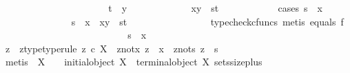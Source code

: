 \begin{isabellebody}
\ \ \ \ \ \ \ \ \ \isamarkupfalse%
\isanewline
\ \ \ \ \ \ \ \ \ \ \ \isamarkupfalse%
\ {\isachardoublequoteopen}t\ {\isasymnoteq}\ y{}{\isachardoublequoteclose}\isanewline
\ \ \ \ \ \ \ \ \ \ \ \isamarkupfalse%
\ {\isachardoublequoteopen}{\isasymlangle}x{\isacharcomma}{\kern0pt}y{\isasymrangle}\ {\isacharequal}{\kern0pt}\ {\isasymlangle}s{\isacharcomma}{\kern0pt}t{\isasymrangle}{\isachardoublequoteclose}\isanewline
\ \ \ \ \ \ \ \ \ \ \ \isamarkupfalse%
{\isacharparenleft}{\kern0pt}cases\ {\isachardoublequoteopen}s\ {\isacharequal}{\kern0pt}\ x{\isachardoublequoteclose}{\isacharparenright}{\kern0pt}\isanewline
\ \ \ \ \ \ \ \ \ \ \ \ \ \isamarkupfalse%
\ {\isachardoublequoteopen}s\ {\isacharequal}{\kern0pt}\ x\ {\isasymLongrightarrow}\ {\isasymlangle}x{\isacharcomma}{\kern0pt}y{\isasymrangle}\ {\isacharequal}{\kern0pt}\ {\isasymlangle}s{\isacharcomma}{\kern0pt}t{\isasymrangle}{\isachardoublequoteclose}\isanewline
\ \ \ \ \ \ \ \ \ \ \ \ \ \ \ \isamarkupfalse%
\ {\isacharparenleft}{\kern0pt}typecheck{\isacharunderscore}{\kern0pt}cfuncs{\isacharcomma}{\kern0pt}\ metis\ equals{}\ f{}{\isacharparenright}{\kern0pt}\isanewline
\ \ \ \ \ \ \ \ \ \ \ \isamarkupfalse%
\isanewline
\ \ \ \ \ \ \ \ \ \ \ \ \ \isamarkupfalse%
\ {\isachardoublequoteopen}s\ {\isasymnoteq}\ x{\isachardoublequoteclose}\ \ \isanewline
\ \ \ \ \ \ \ \ \ \ \ \ \ \isamarkupfalse%
\ z\ \ z{\isacharunderscore}{\kern0pt}type{\isacharbrackleft}{\kern0pt}type{\isacharunderscore}{\kern0pt}rule{\isacharbrackright}{\kern0pt}{\isacharcolon}{\kern0pt}\ {\isachardoublequoteopen}z\ {\isasymin}\isactrlsub c\ X{\isachardoublequoteclose}\ \ z{\isacharunderscore}{\kern0pt}not{\isacharunderscore}{\kern0pt}x{\isacharcolon}{\kern0pt}\ {\isachardoublequoteopen}z\ {\isasymnoteq}\ x{\isachardoublequoteclose}\ \ z{\isacharunderscore}{\kern0pt}not{\isacharunderscore}{\kern0pt}s{\isacharcolon}{\kern0pt}\ {\isachardoublequoteopen}z\ {\isasymnoteq}\ s{\isachardoublequoteclose}\isanewline
\ \ \ \ \ \ \ \ \ \ \ \ \ \ \ \isamarkupfalse%
\ {\isacharparenleft}{\kern0pt}metis\ {\isacartoucheopen}{\isasymnot}\ X\ {\isasymcong}\ {\isasymOmega}{\isacartoucheclose}\ {\isacartoucheopen}{\isasymnot}\ initial{\isacharunderscore}{\kern0pt}object\ X{\isacartoucheclose}\ {\isacartoucheopen}{\isasymnot}\ terminal{\isacharunderscore}{\kern0pt}object\ X{\isacartoucheclose}\ sets{\isacharunderscore}{\kern0pt}size{\isacharunderscore}{\kern0pt}{}{\isacharunderscore}{\kern0pt}plus{\isacharparenright}{\kern0pt}\isanewline

\end{isabellebody}

